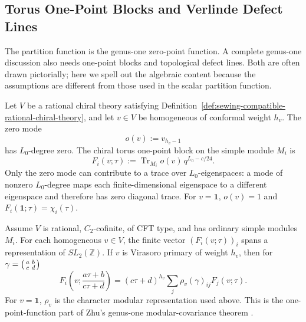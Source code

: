 \subsection{Torus One-Point Blocks and Verlinde Defect Lines}
\label{subsec:torus-one-point-blocks-defect-lines}

The partition function is the genus-one zero-point function.  A complete
genus-one discussion also needs one-point blocks and topological defect
lines.  Both are often drawn pictorially; here we spell out the algebraic
content because the assumptions are different from those used in the scalar
partition function.

Let \(V\) be a rational chiral theory satisfying
Definition~\ref{def:sewing-compatible-rational-chiral-theory}, and let
\(v\in V\) be homogeneous of conformal weight \(h_v\).  The zero mode
\[
  o(v):=v_{h_v-1}
\]
has \(L_0\)-degree zero.  The chiral torus one-point block on the simple
module \(M_i\) is
\begin{equation}
  F_i(v;\tau)
  :=
  \operatorname{Tr}_{M_i}
  o(v)\,q^{L_0-c/24}.
  \label{eq:chiral-torus-one-point-block}
\end{equation}
Only the zero mode can contribute to a trace over \(L_0\)-eigenspaces:
a mode of nonzero \(L_0\)-degree maps each finite-dimensional eigenspace to a
different eigenspace and therefore has zero diagonal trace.  For
\(v=\mathbf 1\), \(o(v)=1\) and \(F_i(\mathbf 1;\tau)=\chi_i(\tau)\).

\begin{quotedtheorem}
\label{qthm:zhu-one-point-modular-covariance}
Assume \(V\) is rational, \(C_2\)-cofinite, of CFT type, and has ordinary
simple modules \(M_i\).  For each homogeneous \(v\in V\), the finite vector
\((F_i(v;\tau))_i\) spans a representation of \(SL_2(\mathbb Z)\).  If \(v\)
is Virasoro primary of weight \(h_v\), then for
\(\gamma=\begin{psmallmatrix}a&b\\ c&d\end{psmallmatrix}\)
\begin{equation}
  F_i\!\left(v;\frac{a\tau+b}{c\tau+d}\right)
  =
  (c\tau+d)^{h_v}
  \sum_j \rho_v(\gamma)_{ij}F_j(v;\tau).
  \label{eq:zhu-one-point-modular-covariance}
\end{equation}
For \(v=\mathbf 1\), \(\rho_v\) is the character modular representation
used above.  This is the one-point-function part of Zhu's genus-one
modular-covariance theorem \cite{Zhu1996}.
\end{quotedtheorem}

